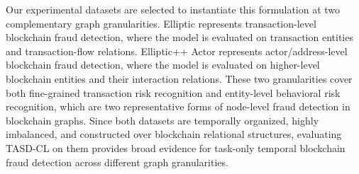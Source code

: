 Our experimental datasets are selected to instantiate this formulation at two complementary graph granularities. Elliptic represents transaction-level blockchain fraud detection, where the model is evaluated on transaction entities and transaction-flow relations. Elliptic++ Actor represents actor/address-level blockchain fraud detection, where the model is evaluated on higher-level blockchain entities and their interaction relations. These two granularities cover both fine-grained transaction risk recognition and entity-level behavioral risk recognition, which are two representative forms of node-level fraud detection in blockchain graphs. Since both datasets are temporally organized, highly imbalanced, and constructed over blockchain relational structures, evaluating TASD-CL on them provides broad evidence for task-only temporal blockchain fraud detection across different graph granularities.